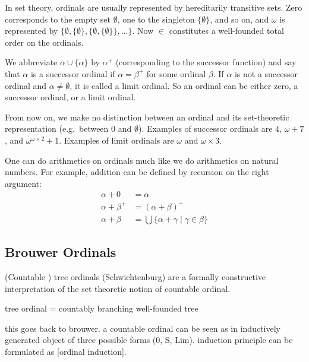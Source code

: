 \documentclass[11pt,oneside,a4paper,final]{report}
\theoremstyle{definition}
\begin{document}
In set theory, ordinals are usually represented by hereditarily transitive
sets. Zero corresponds to the empty set $\emptyset$, one to the singleton $\{
\emptyset \}$, and so on, and $\omega$ is represented by $\{ \emptyset, \{
\emptyset \}, \{ \emptyset, \{ \emptyset \} \} , \ldots \}$. Now $\in$
constitutes a well-founded total order on the ordinals.

We abbreviate $\alpha \cup \{ \alpha \}$ by $\alpha^+$ (corresponding to the
successor function) and say that $\alpha$ is a successor ordinal if $\alpha =
\beta^+$ for some ordinal $\beta$. If $\alpha$ is not a successor ordinal and
$\alpha \neq \emptyset$, it is called a limit ordinal. So an ordinal can
be either zero, a successor ordinal, or a limit ordinal.

From now on, we make no distinction between an ordinal and its set-theoretic
representation (e.g.\ between $0$ and $\emptyset$). Examples of successor
ordinals are $4$, $\omega + 7$, and $\omega^{\omega \times 2} + 1$. Examples
of limit ordinals are $\omega$ and $\omega \times 3$.

One can do arithmetics on ordinals much like we do arithmetics on natural
numbers. For example, addition can be defined by recursion on the right
argument:
\begin{align*}
  \alpha + 0       &= \alpha\\
  \alpha + \beta^+ &= (\alpha + \beta)^+\\
  \alpha + \beta   &= \bigcup \{ \alpha + \gamma \; | \; \gamma \in \beta \}
\end{align*}


\subsection{Brouwer Ordinals}

(Countable ) tree ordinals (Schwichtenburg) are a formally constructive
interpretation of the set theoretic notion of countable ordinal.

tree ordinal = countably branching well-founded tree

this goes back to brouwer. a countable ordinal can be seen as in inductively
generated object of three possible forms (0, S, Lim). induction principle can
be formulated as [ordinal induction].
\end{document}
